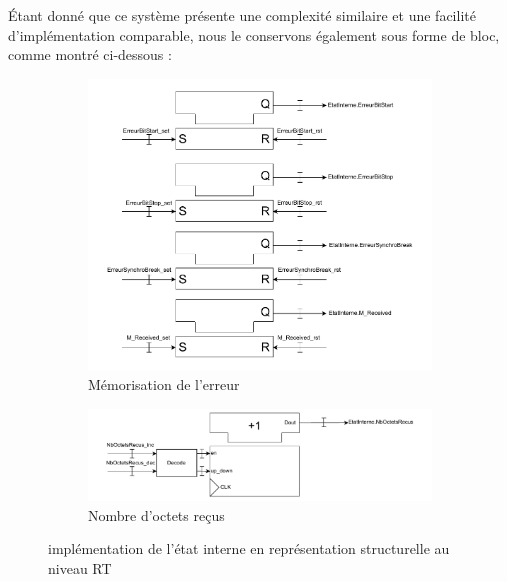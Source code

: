 Étant donné que ce système présente une complexité similaire et une facilité d’implémentation comparable, nous le conservons également sous forme de bloc, comme montré ci-dessous : 
\newline

\begin{figure}[htbp]
    \centering
    \begin{subfigure}[b]{0.49\textwidth}
        \centering
        \includegraphics[width=\textwidth]{images/inter/Implementation_ETAT_Erreur.pdf}
        \caption{Mémorisation de l'erreur}
        \label{fig:placeholder}
    \end{subfigure}
    \hfill
    \begin{subfigure}[b]{0.49\textwidth}
        \centering
        \includegraphics[width=\textwidth]{images/inter/Implementation_ETAT_NbOctets.pdf}
        \caption{Nombre d'octets reçus}
        \label{fig:placeholder}
    \end{subfigure}
    \caption{implémentation de l'état interne en représentation structurelle au niveau RT}
    \label{fig:placeholder} %
\end{figure}
